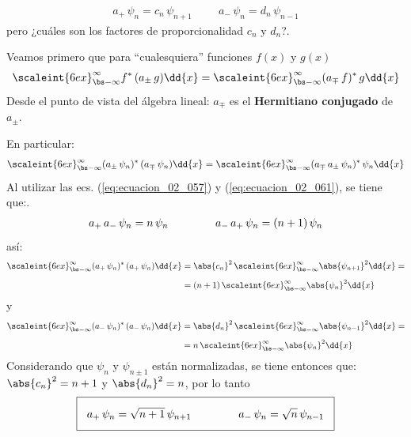 \begin{align}
a_{+} \, \psi_{n} = c_{n} \, \psi_{n+1} \hspace{1cm} a_{-} \, \psi_{n} = d_{n} \, \psi_{n-1}
\label{eq:ecuacion_02_063}
\end{align}
pero ¿cuáles son los factores de proporcionalidad $c_{n}$ y $d_{n}$?.
\par
Veamos primero que para \enquote{cualesquiera} funciones $f(x)$ y $g(x)$
\begin{align}
\scaleint{6ex}_{\bs -\infty}^{\infty} f^{*} \, (a_{\pm} \, g) \dd{x} = \scaleint{6ex}_{\bs -\infty}^{\infty} (a_{\mp} \, f)^{*} \, g \dd{x}
\label{eq:ecuacion_02_064}
\end{align}
Desde el punto de vista del álgebra lineal: $a_{\mp}$ es el \textbf{Hermitiano conjugado} de $a_{\pm}$.
\par
En particular:
\begin{align*}
\scaleint{6ex}_{\bs -\infty}^{\infty} (a_{\pm} \, \psi_{n})^{*} \, (a_{\mp} \, \psi_{n}) \dd{x} = \scaleint{6ex}_{\bs -\infty}^{\infty} (a_{\mp} \, a_{\pm} \, \psi_{n})^{*} \, \psi_{n} \dd{x}
\end{align*}
Al utilizar las ecs. (\ref{eq:ecuacion_02_057}) y (\ref{eq:ecuacion_02_061}), se tiene que:.
\begin{align}
a_{+} \, a_{-} \, \psi_{n} = n \, \psi_{n} \hspace{1.5cm} a_{-} \, a_{+} \, \psi_{n} = (n + 1) \, \psi_{n}
\label{eq:ecuacion_02_065}
\end{align}
así:
\begin{align*}
\scaleint{6ex}_{\bs -\infty}^{\infty} (a_{+} \, \psi_{n})^{*} \, (a_{+} \, \psi_{n}) \dd{x} &= \abs{c_{n}}^{2} \, \scaleint{6ex}_{\bs -\infty}^{\infty} \abs{\psi_{n+1}}^{2} \dd{x} = \\[0.5em]
&= (n + 1) \, \scaleint{6ex}_{\bs -\infty}^{\infty} \abs{\psi_{n}}^{2} \dd{x} 
\end{align*}
y
\begin{align*}
\scaleint{6ex}_{\bs -\infty}^{\infty} (a_{-} \, \psi_{n})^{*} \, (a_{-} \, \psi_{n}) \dd{x} &= \abs{d_{n}}^{2} \, \scaleint{6ex}_{\bs -\infty}^{\infty} \abs{\psi_{n-1}}^{2} \dd{x} = \\[0.5em]
&= n \, \scaleint{6ex}_{\bs -\infty}^{\infty} \abs{\psi_{n}}^{2} \dd{x} 
\end{align*}
Considerando que $\psi_{n}$ y $\psi_{n \pm 1}$ están normalizadas, se tiene entonces que: $\abs{c_{n}}^{2} = n + 1$ y $\abs{d_{n}}^{2} = n$, por lo tanto
\begin{align}
\setlength{\fboxsep}{3\fboxsep}\boxed{
a_{+} \, \psi_{n} = \sqrt{n + 1} \, \psi_{n+1} \hspace{1.5cm} a_{-} \, \psi_{n} = \sqrt{n} \, \psi_{n-1}
}
\label{eq:ecuacion_02_066}
\end{align}
